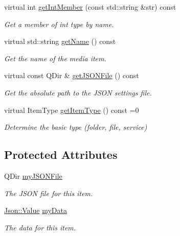 \begin{DoxyCompactItemize}
virtual int \hyperlink{class_a_w_e_1_1_media_item_a18ac2a793896f54695f4796f8457b073}{get\-Int\-Member} (const std\-::string \&str) const 
\begin{DoxyCompactList}\small\item\em Get a member of {\ttfamily int} type by name. \end{DoxyCompactList}\item 
virtual std\-::string \hyperlink{class_a_w_e_1_1_media_item_a20a3275880777c9c5338957ee5d2d1e1}{get\-Name} () const 
\begin{DoxyCompactList}\small\item\em Get the name of the media item. \end{DoxyCompactList}\item 
virtual const Q\-Dir \& \hyperlink{class_a_w_e_1_1_media_item_a6a26f1692daa54667f4efd3f89c2769d}{get\-J\-S\-O\-N\-File} () const 
\begin{DoxyCompactList}\small\item\em Get the absolute path to the J\-S\-O\-N settings file. \end{DoxyCompactList}\item 
virtual Item\-Type \hyperlink{class_a_w_e_1_1_media_item_ad7a7ef28069986fad8b2be060fef6e48}{get\-Item\-Type} () const =0
\begin{DoxyCompactList}\small\item\em Determine the basic type (folder, file, service) \end{DoxyCompactList}\end{DoxyCompactItemize}
\subsection*{Protected Attributes}
\begin{DoxyCompactItemize}
\item 
\hypertarget{class_a_w_e_1_1_media_item_a7f9dd23352cad06e432264b85e58778d}{Q\-Dir \hyperlink{class_a_w_e_1_1_media_item_a7f9dd23352cad06e432264b85e58778d}{my\-J\-S\-O\-N\-File}}\label{class_a_w_e_1_1_media_item_a7f9dd23352cad06e432264b85e58778d}

\begin{DoxyCompactList}\small\item\em The J\-S\-O\-N file for this item. \end{DoxyCompactList}\item 
\hypertarget{class_a_w_e_1_1_media_item_a7af1109bed3163e1c5a33aac5d369ad8}{\hyperlink{class_json_1_1_value}{Json\-::\-Value} \hyperlink{class_a_w_e_1_1_media_item_a7af1109bed3163e1c5a33aac5d369ad8}{my\-Data}}\label{class_a_w_e_1_1_media_item_a7af1109bed3163e1c5a33aac5d369ad8}

\begin{DoxyCompactList}\small\item\em The data for this item. \end{DoxyCompactList}\end{DoxyCompactItemize}


